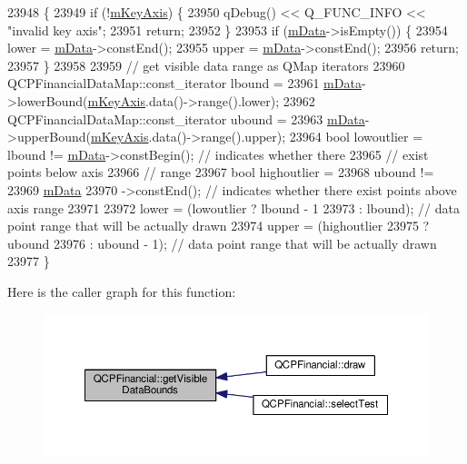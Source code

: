 \begin{DoxyCode}
23948                                                     \{
23949   \textcolor{keywordflow}{if} (!\hyperlink{class_q_c_p_abstract_plottable_a426f42e254d0f8ce5436a868c61a6827}{mKeyAxis}) \{
23950     qDebug() << Q\_FUNC\_INFO << \textcolor{stringliteral}{"invalid key axis"};
23951     \textcolor{keywordflow}{return};
23952   \}
23953   \textcolor{keywordflow}{if} (\hyperlink{class_q_c_p_financial_a475f63587ca1077d8c30aaf2b71ae026}{mData}->isEmpty()) \{
23954     lower = \hyperlink{class_q_c_p_financial_a475f63587ca1077d8c30aaf2b71ae026}{mData}->constEnd();
23955     upper = \hyperlink{class_q_c_p_financial_a475f63587ca1077d8c30aaf2b71ae026}{mData}->constEnd();
23956     \textcolor{keywordflow}{return};
23957   \}
23958 
23959   \textcolor{comment}{// get visible data range as QMap iterators}
23960   QCPFinancialDataMap::const\_iterator lbound =
23961       \hyperlink{class_q_c_p_financial_a475f63587ca1077d8c30aaf2b71ae026}{mData}->lowerBound(\hyperlink{class_q_c_p_abstract_plottable_a426f42e254d0f8ce5436a868c61a6827}{mKeyAxis}.data()->range().lower);
23962   QCPFinancialDataMap::const\_iterator ubound =
23963       \hyperlink{class_q_c_p_financial_a475f63587ca1077d8c30aaf2b71ae026}{mData}->upperBound(\hyperlink{class_q_c_p_abstract_plottable_a426f42e254d0f8ce5436a868c61a6827}{mKeyAxis}.data()->range().upper);
23964   \textcolor{keywordtype}{bool} lowoutlier = lbound != \hyperlink{class_q_c_p_financial_a475f63587ca1077d8c30aaf2b71ae026}{mData}->constBegin(); \textcolor{comment}{// indicates whether there}
23965                                                    \textcolor{comment}{// exist points below axis}
23966                                                    \textcolor{comment}{// range}
23967   \textcolor{keywordtype}{bool} highoutlier =
23968       ubound !=
23969       \hyperlink{class_q_c_p_financial_a475f63587ca1077d8c30aaf2b71ae026}{mData}
23970           ->constEnd(); \textcolor{comment}{// indicates whether there exist points above axis range}
23971 
23972   lower = (lowoutlier ? lbound - 1
23973                       : lbound); \textcolor{comment}{// data point range that will be actually drawn}
23974   upper = (highoutlier
23975                ? ubound
23976                : ubound - 1); \textcolor{comment}{// data point range that will be actually drawn}
23977 \}
\end{DoxyCode}


Here is the caller graph for this function\+:\nopagebreak
\begin{figure}[H]
\begin{center}
\leavevmode
\includegraphics[width=350pt]{class_q_c_p_financial_aca2edf9f19fae733cdb6bd4549019b84_icgraph}
\end{center}
\end{figure}


